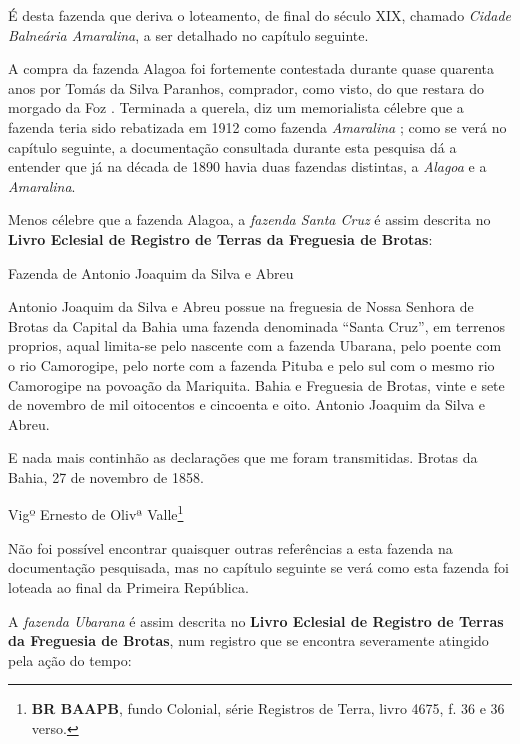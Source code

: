 É desta fazenda que deriva o loteamento, de final do século XIX, chamado \textit{Cidade Balneária Amaralina}, a ser detalhado no capítulo seguinte.

A compra da fazenda Alagoa foi fortemente contestada durante quase quarenta anos por Tomás da Silva Paranhos, comprador, como visto, do que restara do morgado da Foz \cite[p.~118]{campos_alagoa_1942}. Terminada a querela, diz um memorialista célebre que a fazenda teria sido rebatizada em 1912 como fazenda \textit{Amaralina} \cite[p.~118]{campos_alagoa_1942}; como se verá no capítulo seguinte, a documentação consultada durante esta pesquisa dá a entender que já na década de 1890 havia duas fazendas distintas, a \textit{Alagoa} e a \textit{Amaralina}.

Menos célebre que a fazenda Alagoa, a \textit{fazenda Santa Cruz} é assim descrita no \textbf{Livro Eclesial de Registro de Terras da Freguesia de Brotas}:

\begin{citacao}
Fazenda de Antonio Joaquim da Silva e Abreu

Antonio Joaquim da Silva e Abreu possue na freguesia de Nossa Senhora de Brotas da Capital da Bahia uma fazenda denominada ``Santa Cruz'', em terrenos proprios, aqual limita-se pelo nascente com a fazenda Ubarana, pelo poente com o rio Camorogipe, pelo norte com a fazenda Pituba e pelo sul com o mesmo rio Camorogipe na povoação da Mariquita. Bahia e Freguesia de Brotas, vinte e sete de novembro de mil oitocentos e cincoenta e oito. Antonio Joaquim da Silva e Abreu.

E nada mais continhão as declarações que me foram transmitidas. Brotas da Bahia, 27 de novembro de 1858.

Vigº Ernesto de Olivª Valle\footnote{\textbf{BR BAAPB}, fundo Colonial, série Registros de Terra, livro 4675, f. 36 e 36 verso.}
\end{citacao}

Não foi possível encontrar quaisquer outras referências a esta fazenda na documentação pesquisada, mas no capítulo seguinte se verá como esta fazenda foi loteada ao final da Primeira República.

A \textit{fazenda Ubarana} é assim descrita no \textbf{Livro Eclesial de Registro de Terras da Freguesia de Brotas}, num registro que se encontra severamente atingido pela ação do tempo:

